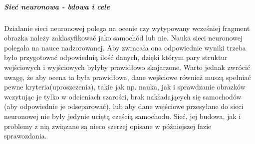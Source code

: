 \documentclass{article}
\begin{document}
\subparagraph{Sieć neuronowa - bdowa i cele} Działanie sieci neuronowej polega na ocenie czy wytypowany wcześniej fragment obrazka należy zaklasyfikować jako samochód lub nie. Nauka sieci neuronowej polegała na nauce nadzorowanej. Aby zwracała ona odpowiednie wyniki trzeba było przygotować odpowiednią ilość danych, dzięki którym pary struktur wejściowych i wyjściowych byłyby prawidłowo skojarzone. Warto jednak zwrócić uwagę, że aby ocena ta była prawidłowa, dane wejściowe również muszą spełniać pewne kryteria(uproszczenia), takie jak np. nauka, jak i sprawdzanie obrazków wczytując je tylko w odcieniach szarości, brak nakładających się samochodów (aby odpowiednie je odseparować), lub aby dane wejściowe przesyłane do sieci neuronowej nie były jedynie uciętą częścią samochodu. Sieć, jej budowa, jak i problemy z nią związane są nieco szerzej opisane w późniejszej fazie sprawozdania.
\end{document}
